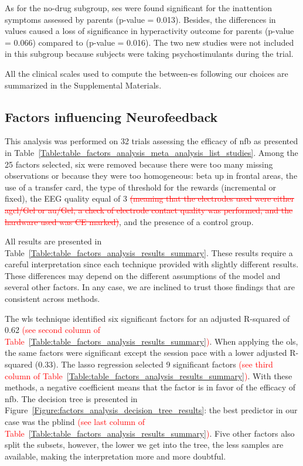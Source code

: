As for the no-drug subgroup, \glspl{se} were found significant for the inattention symptoms assessed by parents (p-value = 0.013). 
Besides, the differences in \citet{Arnold2014} values caused a loss of significance in hyperactivity outcome for parents 
(p-value = 0.066) compared to \citet{Cortese2016} (p-value = 0.016). The two new studies were not included in this 
subgroup because subjects were taking psychostimulants during the trial.

All the clinical scales used to compute the between-\gls{es} following our choices are summarized in the Supplemental Materials.

\subsection{Factors influencing Neurofeedback}

This analysis was performed on 32 trials assessing the efficacy of \gls{nfb} as presented 
in Table~\ref{Table:table_factors_analysis_meta_analysis_list_studies}. Among the 25 factors selected, six were 
removed because there were too many missing observations or because they were too homogeneous: beta up in frontal areas, 
the use of a transfer card, the type of threshold for the rewards (incremental or fixed), the EEG quality equal of 3
\textcolor{red}{\sout{(meaning that the electrodes used were either \gls{agcl}/Gel or \gls{au}/Gel, a check of electrode contact quality was
performed, and the hardware used was CE marked)}}, and the presence of a control group. 

All results are presented in Table~\ref{Table:table_factors_analysis_results_summary}. These results require a 
careful interpretation since each technique provided with slightly different results. These differences 
may depend on the different assumptions of the model and several other factors. In any case, we are inclined to 
trust those findings that are consistent across methods. 

The \gls{wls} technique identified six significant factors for an adjusted R-squared of 0.62 \textcolor{red}{(see second column of 
Table~\ref{Table:table_factors_analysis_results_summary})}. 
When applying the \gls{ols}, the same factors were significant except the session pace with a lower adjusted R-squared 
(0.33). The \gls{lasso} regression selected 9 significant factors \textcolor{red}{(see third column of 
Table~\ref{Table:table_factors_analysis_results_summary})}. With these methods, a negative coefficient means 
that the factor is in favor of the efficacy of \gls{nfb}. The decision tree is presented in Figure~\ref{Figure:factors_analysis_decision_tree_results}: 
the best predictor in our case was the \gls{pblind} \textcolor{red}{(see last column of 
Table~\ref{Table:table_factors_analysis_results_summary})}. Five other factors also split the subsets, however, 
the lower we get into the tree, the less samples are available, making the interpretation more and more doubtful.  


